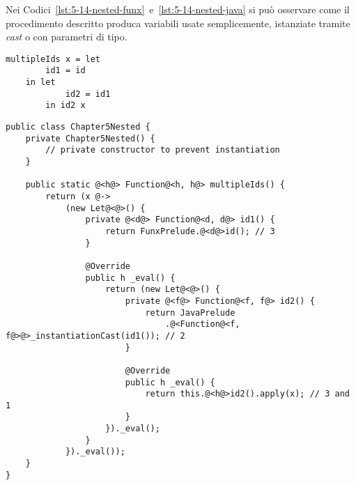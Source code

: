 \newpage

\noindent Nei Codici~\ref{lst:5-14-nested-funx}~e~\ref{lst:5-14-nested-java} si può osservare come il procedimento
descritto produca variabili usate semplicemente, istanziate tramite \textit{cast} o con parametri di tipo.

\vspace{4mm}
\begin{lstlisting}[caption={\texttt{Let} annidati e differente uso di variabili polimorfe}, style=funxCode, label={lst:5-14-nested-funx}]
multipleIds x = let
        id1 = id
    in let
            id2 = id1
        in id2 x
\end{lstlisting}
\vspace{4mm}
\begin{lstlisting}[caption={Corrispondente traduzione in \texttt{Java}}, style=javaCode, label={lst:5-14-nested-java}]
public class Chapter5Nested {
    private Chapter5Nested() {
        // private constructor to prevent instantiation
    }
    
    public static @<h@> Function@<h, h@> multipleIds() {
        return (x @->
            (new Let@<@>() {
                private @<d@> Function@<d, d@> id1() {
                    return FunxPrelude.@<d@>id(); // 3
                }
    
                @Override
                public h _eval() {
                    return (new Let@<@>() {
                        private @<f@> Function@<f, f@> id2() {
                            return JavaPrelude
                                .@<Function@<f, f@>@>_instantiationCast(id1()); // 2
                        }
    
                        @Override
                        public h _eval() {
                            return this.@<h@>id2().apply(x); // 3 and 1
                        }
                    })._eval();
                }
            })._eval());
    }
}
\end{lstlisting}